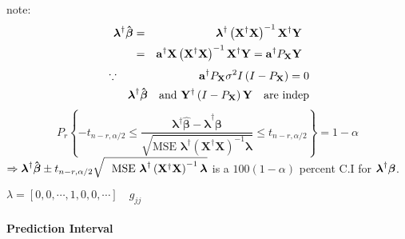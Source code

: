 \documentclass{article}
\begin{document}
note:%
\begin{eqnarray*}
\mathbf{\lambda }^{\dagger }\mathbf{\hat{\beta}} &=&\mathbf{\lambda }%
^{\dagger }\left( \mathbf{X}^{\dagger }\mathbf{X}\right) ^{-1}\mathbf{X}%
^{\dagger }\mathbf{Y} \\
&=&\mathbf{a}^{\dagger }\mathbf{X}\left( \mathbf{X}^{\dagger }\mathbf{X}%
\right) ^{-1}\mathbf{X}^{\dagger }\mathbf{Y}=\mathbf{a}^{\dagger }P_{\mathbf{%
X}}\mathbf{Y}
\end{eqnarray*}%
\begin{eqnarray*}
&\because &\mathbf{a}^{\dagger }P_{\mathbf{X}}\sigma ^{2}I\left( I-P_{%
\mathbf{X}}\right) =0 \\
&\therefore &\mathbf{\lambda }^{\dagger }\mathbf{\hat{\beta}}\text{ and }%
\mathbf{Y}^{\dagger }\left( I-P_{\mathbf{X}}\right) \mathbf{Y}\text{ are
indep}
\end{eqnarray*}%
\begin{equation*}
P_{r}\left\{ -t_{n-r,\alpha /2}\leq \frac{\mathbf{\lambda }^{\dagger }%
\mathbf{\hat{\beta}-\lambda }^{\dagger }\mathbf{\beta }}{\sqrt{\text{MSE }%
\mathbf{\lambda }^{\dagger }\left( \mathbf{X}^{\dagger }\mathbf{X}\right)
^{-1}\mathbf{\lambda }}}\leq t_{n-r,\alpha /2}\right\} =1-\alpha 
\end{equation*}%
\newline
\newline
$\Rightarrow \mathbf{\lambda }^{\dagger }\mathbf{\hat{\beta}}\pm
t_{n-r,\alpha /2}\sqrt{\text{MSE }\mathbf{\lambda }^{\dagger }\left( \mathbf{%
X}^{\dagger }\mathbf{X}\right) ^{-1}\mathbf{\lambda }}$ is a $100\left(
1-\alpha \right) $ percent C.I for $\mathbf{\lambda }^{\dagger }\mathbf{%
\beta }$.\newline
\newline

$\lambda =\left[ 0,0,\cdots ,1,0,0,\cdots \right] \quad g_{jj}$

\bigskip 

\paragraph{Prediction Interval}
\end{document}
